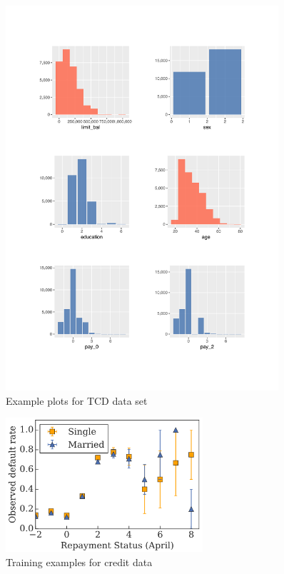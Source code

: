 \begin{figure}[!htb]
    \begin{center}
        \includegraphics[width=0.9\textwidth]{img/ov_plot}
        \caption{Example plots for TCD data set}
        \label{Fig:ovplot}
    \end{center}
\end{figure}

\pagebreak

\begin{figure}[!htb]
	\begin{center}
		\includegraphics[width=0.65\textwidth]{img/gup3}
		\caption{Training examples for credit data \citep{wang2020deontological}}
		\label{Fig:gup3}
	\end{center}
\end{figure}